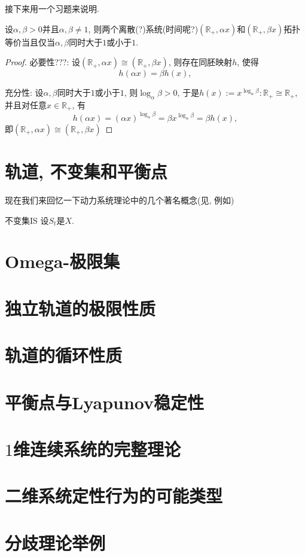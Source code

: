 接下来用一个习题来说明. 

\begin{exercise}
设$\alpha,\beta>0$并且$\alpha,\beta\neq 1$, 则两个离散(?)系统(时间呢?)$(\mathbb{R}_{+},\alpha x)$和$(\mathbb{R}_{+},\beta x)$拓扑等价当且仅当$\alpha,\beta$同时大于$1$或小于$1$.
\end{exercise}

\begin{proof}
	必要性???: 设$(\mathbb{R}_{+},\alpha x)\cong (\mathbb{R}_{+},\beta x)$, 则存在同胚映射$h$, 使得$$
	h(\alpha x)=\beta h(x),$$
	
	充分性: 设$\alpha,\beta$同时大于$1$或小于$1$, 则$\log_{\alpha}\beta>0$, 于是$h(x):=x^{\log_{\alpha}\beta}:\mathbb{R}_{+}\cong \mathbb{R}_{+}$, 并且对任意$x\in\mathbb{R}_{+}$, 有$$h(\alpha x)=(\alpha x)^{\log_{\alpha}\beta}=\beta x^{\log_{\alpha}\beta}=\beta h(x),$$即$(\mathbb{R}_{+},\alpha x)\cong (\mathbb{R}_{+},\beta x)$
\end{proof}


\section{轨道, 不变集和平衡点}
现在我们来回忆一下动力系统理论中的几个著名概念(见, 例如)

\begin{definition}{不变集}{IS}
	设$S_{t}$是$X$.
\end{definition}


\section{Omega-极限集}
\section{独立轨道的极限性质}
\section{轨道的循环性质}
\section{平衡点与Lyapunov稳定性}
\section{$1$维连续系统的完整理论}
\section{二维系统定性行为的可能类型}
\section{分歧理论举例}
